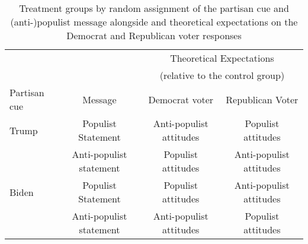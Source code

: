 \begin{table*}[th!]
\centering
\caption{Treatment groups by random assignment of the partisan cue and (anti-)populist message alongside and theoretical expectations on the Democrat and Republican voter responses\label{tab-expectations}}
\small
\begin{tabular}{lccc}
\toprule
 &  & \multicolumn{2}{c}{Theoretical Expectations}    \\
 &  & \multicolumn{2}{c}{(relative to the control group)}     \\
\midrule
Partisan cue & Message & Democrat voter & Republican Voter    \\
\midrule
Trump & Populist Statement & Anti-populist attitudes & Populist attitudes   \\
 & Anti-populist statement & Populist attitudes & Anti-populist attitudes  \\
Biden & Populist Statement & Populist attitudes & Anti-populist attitudes   \\
 & Anti-populist statement & Anti-populist attitudes & Populist attitudes   \\
\bottomrule
\end{tabular}
\end{table*}
